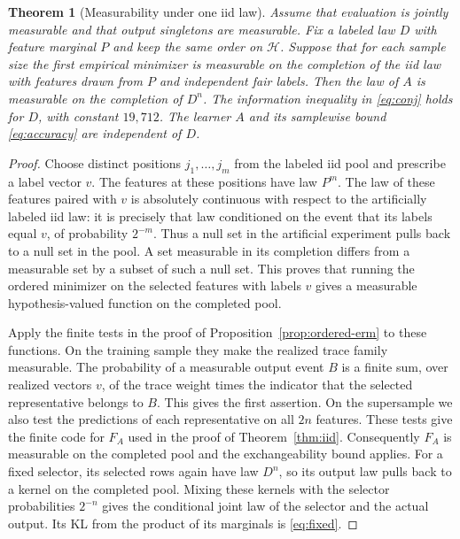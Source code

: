 \documentclass[11pt]{article}
\newtheorem{theorem}{Theorem}[section]
\theoremstyle{definition}\newtheorem{definition}[theorem]{Definition}
\newcommand{\HH}{\mathcal H}
\begin{document}
\begin{theorem}[Measurability under one iid law]\label{thm:iid-erm}
Assume that evaluation is jointly measurable and that output singletons are
measurable. Fix a labeled law $D$ with feature marginal $P$ and keep the
same order on $\HH$. Suppose that for each sample size the first empirical
minimizer is measurable on the completion of the iid law with features
drawn from $P$ and independent fair labels. Then the law of $A$ is
measurable on the completion of $D^n$. The information inequality in
\eqref{eq:conj} holds for $D$, with constant $19{,}712$. The learner $A$
and its samplewise bound \eqref{eq:accuracy} are independent of $D$.
\end{theorem}
\begin{proof}
Choose distinct positions $j_1,\ldots,j_m$ from the labeled iid pool and
prescribe a label vector $v$. The features at these positions have law
$P^m$. The law of these features paired with $v$ is absolutely continuous
with respect to the artificially labeled iid law: it is precisely that
law conditioned on the event that its labels equal $v$, of probability
$2^{-m}$. Thus a null set in the artificial experiment pulls back to a null
set in the pool. A set measurable in its completion differs from a measurable
set by a subset of such a null set. This proves that running the ordered
minimizer on the selected features with labels $v$ gives a measurable
hypothesis-valued function on the completed pool.

Apply the finite tests in the proof of Proposition~\ref{prop:ordered-erm}
to these functions. On the training sample they make the realized trace
family measurable. The probability of a measurable output event $B$ is
a finite sum, over realized vectors $v$, of the trace weight times the
indicator that the selected representative belongs to $B$. This gives the
first assertion. On the supersample we also test the predictions of each
representative on all $2n$ features. These tests give the finite code for
$F_A$ used in the proof of Theorem~\ref{thm:iid}. Consequently $F_A$ is
measurable on the completed pool and the exchangeability bound applies.
For a fixed selector, its selected rows again have law $D^n$, so its output
law pulls back to a kernel on the completed pool. Mixing these kernels
with the selector probabilities $2^{-n}$ gives the conditional joint law
of the selector and the actual output. Its KL from the product of its
marginals is \eqref{eq:fixed}.
\end{proof}
\end{document}
